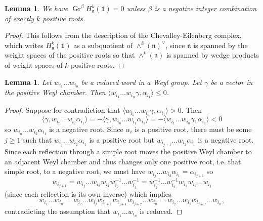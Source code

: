\documentclass[11pt,letterpaper]{article}
\newtheorem{lemma}[theorem]{Lemma}
\theoremstyle{definition}
\theoremstyle{remark}
\numberwithin{equation}{section}
\theoremstyle{dotless}
\newcommand{\Gr}{\operatorname{Gr}}
\newcommand{\LieH}{H}
\begin{document}
 \begin{lemma}\label{negative-positive} We have $\Gr^\beta \LieH^{k}_{\mathfrak n} ( \mathbf 1) =0$ unless $\beta$ is a negative integer combination of exactly $k$ positive roots. \end{lemma}
 
 \begin{proof} This follows from the description of the Chevalley-Eilenberg complex, which writes $\LieH^{k}_{\mathfrak n} ( \mathbf 1) $ as a subquotient of $\wedge^k (\mathfrak n)^\vee$, since $\mathfrak n$ is spanned by the weight spaces of the positive roots so that $\wedge^k (\mathfrak n)$ is spanned by wedge products of weight spaces of $k$ positive roots. \end{proof}
 
 \begin{lemma}\label{reduced-word-criterion} Let $w_{i_1} \dots w_{i_n}$ be a reduced word in a Weyl group. Let $\gamma$ be a vector in the positive Weyl chamber. Then $ \langle  w_{i_1} \dots w_{i_n}\gamma, \alpha_{i_1} \rangle \leq 0$. \end{lemma}
 
 \begin{proof} Suppose for contradiction that  $ \langle  w_{i_1} \dots w_{i_n}\gamma, \alpha_{i_1} \rangle > 0$. Then  \[ \langle  \gamma, w_{i_n} \dots w_{i_2}  \alpha_{i_1} \rangle =- \langle  \gamma, w_{i_n} \dots w_{i_1}  \alpha_{i_1} \rangle =-  \langle  w_{i_1} \dots w_{i_n}\gamma, \alpha_{i_1} \rangle < 0\] so $w_{i_n} \dots w_{i_2}  \alpha_{i_1} $ is a negative root. Since $\alpha_i$ is a positive root, there must be some $j\geq 1$ such that $ w_{i_j} \dots w_{i_2} \alpha_{i_1} $ is a positive root but $w_{i_{j+1}} \dots w_{i_2} \alpha_{i_1}$ is a negative root. Since each reflection through a simple root moves the positive Weyl chamber to an adjacent Weyl chamber and thus changes only one positive root, i.e. that simple root, to a negative root, we must have $w_{i_j} \dots w_{i_2} \alpha_{i_1} = \alpha_{i_{j+1}} $ so  \[ w_{i_{j+1}} = w_{i_j} \dots w_{i_2} w_{i_1} w_{i_2}^{-1} \dots w_{i_j}^{-1} =w_{i_j}^{-1} \dots w_{i_2}^{-1} w_{i_1} w_{i_2} \dots w_{i_j}  \] (since each reflection is its own inverse) which implies \[ w_{i_1} \dots w_{i_n} = w_{i_2} \dots w_{i_j} w_{i_{j+1}  }  w_{i_{j+1}} w_{i_{j+2}} \dots w_{i_n} = w_{i_2} \dots w_{i_j} w_{i_{j+2}} \dots w_{i_n},\] contradicting the assumption that $w_{i_1} \dots w_{i_n}$  is reduced. \end{proof}
 
 
\end{document}
